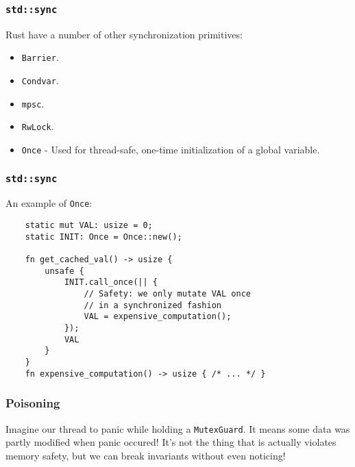 \documentclass[aspectratio=1610,t]{beamer}
\begin{document}

\begin{frame}[fragile]
\frametitle{\texttt{std::sync}}
Rust have a number of other synchronization primitives:

\begin{itemize}
    \item \texttt{Barrier}.
    \item \texttt{Condvar}.
    \item \texttt{mpsc}.
    \item \texttt{RwLock}.
    \item \texttt{Once} - Used for thread-safe, one-time initialization of a global variable.
\end{itemize}
\end{frame}


\begin{frame}[fragile]
\frametitle{\texttt{std::sync}}
An example of \texttt{Once}:

\begin{verbatim}
    static mut VAL: usize = 0;
    static INIT: Once = Once::new();

    fn get_cached_val() -> usize {
        unsafe {
            INIT.call_once(|| {
                // Safety: we only mutate VAL once
                // in a synchronized fashion
                VAL = expensive_computation();
            });
            VAL
        }
    }
    fn expensive_computation() -> usize { /* ... */ }
\end{verbatim}
\end{frame}


\begin{frame}[fragile]
\frametitle{Poisoning}
Imagine our thread to panic while holding a \texttt{MutexGuard}. It means some data was partly modified when panic occured! It's not the thing that is actually violates memory safety, but we can break invariants without even noticing!

\end{frame}
\end{document}
